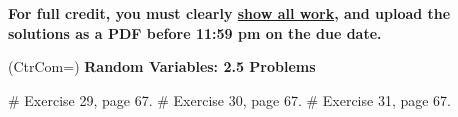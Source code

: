 \documentclass[11pt]{book}
\begin{document}
\thispagestyle{fancy}
\noindent	\textbf{For full credit, you must clearly \underline{show all work}, and upload the solutions as a PDF before 11:59 pm on the due date.}\hfill
\vspace{0.3in}

\begin{easylist}
\ListProperties(CtrCom=\fbox)
\noindent\textbf{Random Variables: 2.5 Problems}\\
\vspace{0.5in}

# Exercise 29, page 67.
\vspace{0.2in} 
# Exercise 30, page 67.
\vspace{0.2in}
# Exercise 31, page 67.
 \end{easylist}
\end{document}
